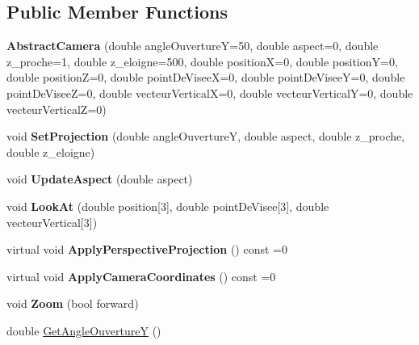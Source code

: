 \subsection*{Public Member Functions}
\begin{DoxyCompactItemize}
\item 
\mbox{\label{classAbstractCamera_afb84db4f342d80345294ab940f5ecb7e}} 
{\bfseries Abstract\+Camera} (double angle\+OuvertureY=50, double aspect=0, double z\+\_\+proche=1, double z\+\_\+eloigne=500, double positionX=0, double positionY=0, double positionZ=0, double point\+De\+ViseeX=0, double point\+De\+ViseeY=0, double point\+De\+ViseeZ=0, double vecteur\+VerticalX=0, double vecteur\+VerticalY=0, double vecteur\+VerticalZ=0)
\item 
\mbox{\label{classAbstractCamera_a744f0a7bf3bbb7e75de755a14e0651cc}} 
void {\bfseries Set\+Projection} (double angle\+OuvertureY, double aspect, double z\+\_\+proche, double z\+\_\+eloigne)
\item 
\mbox{\label{classAbstractCamera_ace3869e4ccf186413fe30c555a2af0bb}} 
void {\bfseries Update\+Aspect} (double aspect)
\item 
\mbox{\label{classAbstractCamera_a00c2423128b3c6ae57b651e1230b9d61}} 
void {\bfseries Look\+At} (double position\mbox{[}3\mbox{]}, double point\+De\+Visee\mbox{[}3\mbox{]}, double vecteur\+Vertical\mbox{[}3\mbox{]})
\item 
\mbox{\label{classAbstractCamera_a7b55cf6aea08ad6b0a6a3cf7e985fd6b}} 
virtual void {\bfseries Apply\+Perspective\+Projection} () const =0
\item 
\mbox{\label{classAbstractCamera_af4fd2e135457dca8d43eb5dfc15f959c}} 
virtual void {\bfseries Apply\+Camera\+Coordinates} () const =0
\item 
\mbox{\label{classAbstractCamera_a4bd911919d627cb31042ad9342e5b03d}} 
void {\bfseries Zoom} (bool forward)
\item 
double \mbox{\hyperlink{classAbstractCamera_abdff3ca2922e09f59d3f1c026d78420d}{Get\+Angle\+OuvertureY}} ()
\item 
\mbox{\label{classAbstractCamera_a59cd96f58f9bf36a8835f28c4b83f71d}} 

\end{DoxyCompactItemize}
